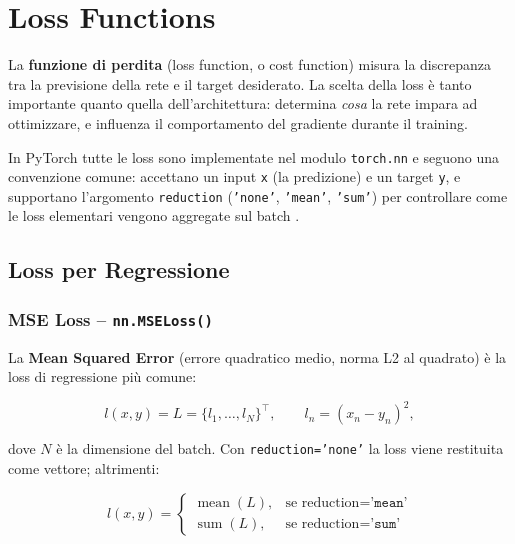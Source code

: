 \chapter{Loss Functions}
\label{ch:loss-functions}

La \textbf{funzione di perdita} (loss function, o cost function) misura la discrepanza
tra la previsione della rete e il target desiderato. La scelta della loss è tanto
importante quanto quella dell'architettura: determina \textit{cosa} la rete impara
ad ottimizzare, e influenza il comportamento del gradiente durante il training.

In PyTorch tutte le loss sono implementate nel modulo \texttt{torch.nn} e seguono
una convenzione comune: accettano un input \texttt{x} (la predizione) e un target
\texttt{y}, e supportano l'argomento \texttt{reduction} (\texttt{'none'},
\texttt{'mean'}, \texttt{'sum'}) per controllare come le loss elementari vengono
aggregate sul batch \citep{bishop2024}.

\section{Loss per Regressione}
\label{sec:regression-losses}

\subsection{MSE Loss -- \texttt{nn.MSELoss()}}
\label{subsec:mse}

La \textbf{Mean Squared Error} (errore quadratico medio, norma L2 al quadrato)
è la loss di regressione più comune:

\begin{equation}
  l(x, y) = L = \{l_1, \ldots, l_N\}^\top, \qquad
  l_n = (x_n - y_n)^2,
\end{equation}

dove $N$ è la dimensione del batch. Con \texttt{reduction='none'} la loss viene
restituita come vettore; altrimenti:

\begin{equation}
  l(x, y) =
  \begin{cases}
    \operatorname{mean}(L), & \text{se reduction} = \texttt{'mean'} \\
    \operatorname{sum}(L),  & \text{se reduction} = \texttt{'sum'}
  \end{cases}
\end{equation}

